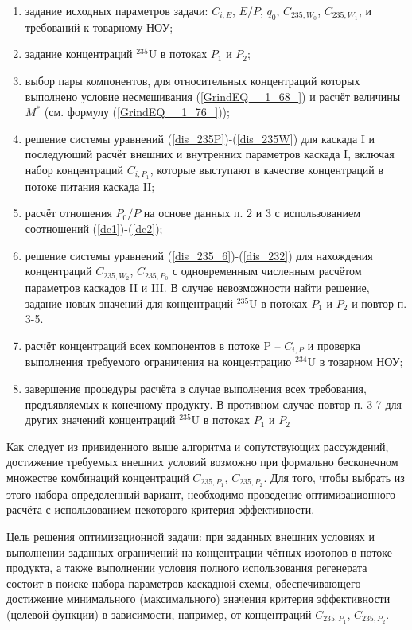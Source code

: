 \begin{enumerate}
    \item задание исходных параметров задачи: $C_{i,E}$, $E/P$, $q_0$, $C_{235,{W_0}}$, $C_{235,{W_1}}$, и требований к товарному НОУ;
    \item задание концентраций $^{235}$U в потоках $P_1$ и $P_2$;
    \item выбор пары компонентов, для относительных концентраций которых выполнено условие несмешивания (\ref{GrindEQ__1_68_}) и расчёт величины $M^{*}$ (см. формулу (\ref{GrindEQ__1_76_}));
    \item решение системы уравнений (\ref{dis_235P})-(\ref{dis_235W}) для каскада I и последующий расчёт внешних и внутренних параметров каскада I, включая набор концентраций $C_{i,{P_1}}$, которые выступают в качестве концентраций в потоке питания каскада II;
    \item расчёт отношения ${P_0}/P$ на основе данных п. 2 и 3 с использованием соотношений (\ref{dc1})-(\ref{dc2});
    \item решение системы уравнений (\ref{dis_235_6})-(\ref{dis_232}) для нахождения концентраций $C_{235,{W_2}}$, $C_{235,{P_0}}$ с одновременным численным расчётом параметров каскадов II и III. В случае невозможности найти решение, задание новых значений для концентраций $^{235}$U в потоках $P_1$ и $P_2$ и повтор п. 3-5. 
    \item расчёт концентраций всех компонентов в потоке P -- $C_{i, P}$ и проверка выполнения требуемого ограничения на концентрацию $^{234}$U в товарном НОУ;
    \item завершение процедуры расчёта в случае выполнения всех требования, предъявляемых к конечному продукту. В противном случае повтор п. 3-7 для других значений концентраций $^{235}$U в потоках $P_1$ и $P_2$
\end{enumerate}

Как следует из привиденного выше алгоритма и сопутствующих рассуждений, достижение требуемых внешних условий возможно при формально бесконечном множестве комбинаций концентраций $C_{235,{P_1}}$, $C_{235,{P_2}}$. Для того, чтобы выбрать из этого набора определенный вариант, необходимо проведение оптимизационного расчёта с использованием некоторого критерия эффективности. 

Цель решения оптимизационной задачи: при заданных внешних условиях и выполнении заданных ограничений на концентрации чётных изотопов в потоке продукта, а также выполнении условия полного использования регенерата состоит в поиске набора параметров каскадной схемы, обеспечивающего достижение минимального (максимального) значения критерия эффективности (целевой функции) в зависимости, например, от концентраций $C_{235,{P_1}}$, $C_{235,{P_2}}$.

